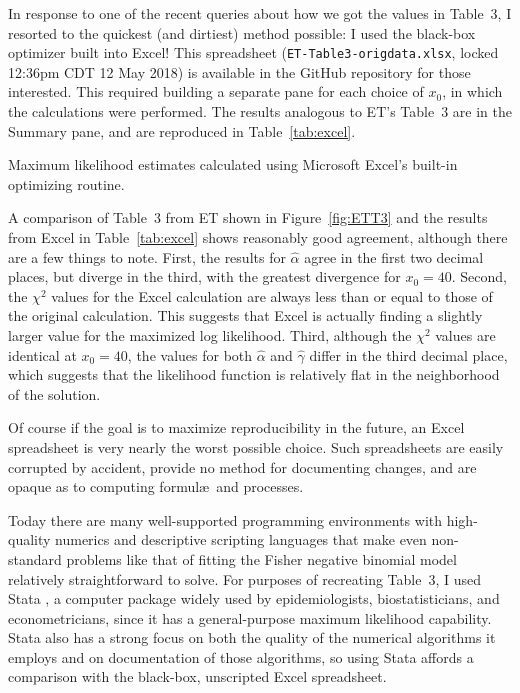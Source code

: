 	In response to one of the recent queries about how we got the values in Table~3, I resorted to the quickest (and dirtiest) method possible: I used the black-box optimizer built into Excel!  This spreadsheet (\texttt{ET-Table3-origdata.xlsx}, locked 12:36pm CDT 12 May 2018) is available in the GitHub repository for those interested.  This required building a separate pane for each choice of $x_0$, in which the calculations were performed.  The results analogous to ET's Table~3 are in the Summary pane, and are reproduced in Table~\ref{tab:excel}.
	
\begin{table}
	\centering
	
	\caption{Maximum likelihood estimates calculated using Microsoft Excel's built-in optimizing routine.}\label{tab:excel}
\end{table}

	A comparison of Table~3 from ET shown in Figure~\ref{fig:ETT3} and the results from Excel in Table~\ref{tab:excel} shows reasonably good agreement, although there are a few things to note.  First, the results for $\hat\alpha$ agree in the first two decimal places, but diverge in the third, with the greatest divergence for $x_0=40$.  Second, the $\chi^2$ values for the Excel calculation are always less than or equal to those of the original calculation.  This suggests that Excel is actually finding a slightly larger value for the maximized log likelihood.  Third, although the $\chi^2$ values are identical at $x_0=40$, the values for both $\hat\alpha$ and $\hat\gamma$ differ in the third decimal place, which suggests that the likelihood function is relatively flat in the neighborhood of the solution.
	
	Of course if the goal is to maximize reproducibility in the future, an Excel spreadsheet is very nearly the worst possible choice.  Such spreadsheets are easily corrupted by accident, provide no method for documenting changes, and are opaque as to computing formul\ae\ and processes.

	Today there are many well-supported programming environments with high-quality numerics and descriptive scripting languages that make even  non-standard problems like that of fitting the Fisher negative binomial model relatively straightforward to solve.  For purposes of recreating Table~3, I used Stata \citeyear{StataCorp:2017aa}, a computer package widely used by epidemiologists, biostatisticians, and econometricians, since it has a general-purpose maximum likelihood capability.  Stata also has a strong focus on both the quality of the numerical algorithms it employs and on documentation of those algorithms, so using Stata affords a comparison with the black-box, unscripted Excel spreadsheet.
	
